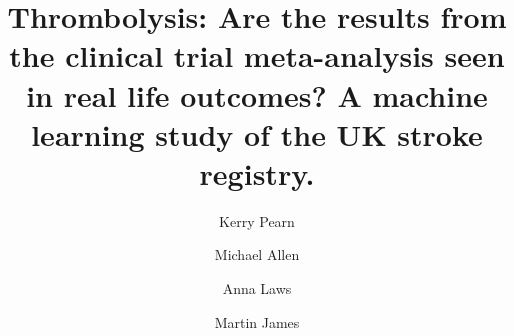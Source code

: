 \title{Thrombolysis: Are the results from the clinical trial meta-analysis seen in real life outcomes?  A machine learning study of the UK stroke registry.}


\renewcommand{\thefootnote}{\fnsymbol{footnote}}
\author[1,2]{Kerry Pearn}
\author[*1,2]{Michael Allen}
\author[1,2]{Anna Laws}
\author[1,2]{Martin James}

